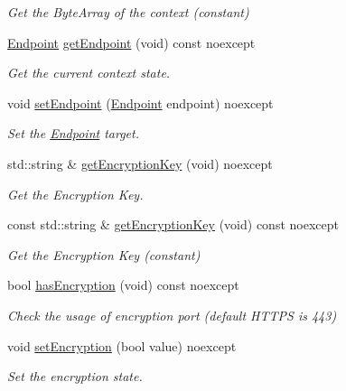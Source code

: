 \begin{DoxyCompactItemize}
\begin{DoxyCompactList}\small\item\em Get the Byte\+Array of the context (constant) \end{DoxyCompactList}\item 
\mbox{\hyperlink{classo_z_1_1_endpoint}{Endpoint}} \mbox{\hyperlink{classo_z_1_1_packet_a89367cc491fdfdb6bf88eda9bc4eb219}{get\+Endpoint}} (void) const noexcept
\begin{DoxyCompactList}\small\item\em Get the current context\textquotesingle{} state. \end{DoxyCompactList}\item 
void \mbox{\hyperlink{classo_z_1_1_packet_a53cd7a27e65dcb1667d9a0beb1dc2f66}{set\+Endpoint}} (\mbox{\hyperlink{classo_z_1_1_endpoint}{Endpoint}} endpoint) noexcept
\begin{DoxyCompactList}\small\item\em Set the \mbox{\hyperlink{classo_z_1_1_endpoint}{Endpoint}} target. \end{DoxyCompactList}\item 
std\+::string \& \mbox{\hyperlink{classo_z_1_1_packet_a93abca1901de8784297e53e2a92dc810}{get\+Encryption\+Key}} (void) noexcept
\begin{DoxyCompactList}\small\item\em Get the Encryption Key. \end{DoxyCompactList}\item 
const std\+::string \& \mbox{\hyperlink{classo_z_1_1_packet_a71f6029e78232544fd48761de456719a}{get\+Encryption\+Key}} (void) const noexcept
\begin{DoxyCompactList}\small\item\em Get the Encryption Key (constant) \end{DoxyCompactList}\item 
bool \mbox{\hyperlink{classo_z_1_1_packet_abf9bd4979afb439272832d5a90f7d556}{has\+Encryption}} (void) const noexcept
\begin{DoxyCompactList}\small\item\em Check the usage of encryption port (default H\+T\+T\+PS is 443) \end{DoxyCompactList}\item 
void \mbox{\hyperlink{classo_z_1_1_packet_acb3412cd14f3dd6749f8dfa0892f4bf4}{set\+Encryption}} (bool value) noexcept
\begin{DoxyCompactList}\small\item\em Set the encryption state. \end{DoxyCompactList}\end{DoxyCompactItemize}



